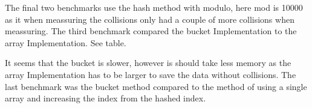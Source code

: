 \documentclass[a4paper,11pt]{article}
\begin{document}
\begin{table}[h]
    \begin{center}
    \caption{Results from the benchmark of binary search compared to looking directly in an array}
    \label{tab:table2}
    \end{center}
\end{table}

\FloatBarrier{\noindent}
The final two benchmarks use the hash method with modulo, here mod is 10000 as it when meassuring the collisions only had a couple of 
more collisions when meassuring. The third benchmark compared the bucket Implementation to the array Implementation. See table.

\begin{table}[h]
    \begin{center}
    \caption{Results from the benchmark of bucket compared to looking directly in an array}
    \label{tab:table3}
    \end{center}
\end{table}

\FloatBarrier{\noindent}
It seems that the bucket is slower, however is should take less memory as the array Implementation has to be larger to save the data without collisions. The last benchmark was the bucket method compared to the 
method of using a single array and increasing the index from the hashed index. 
\begin{table}[h]
    \begin{center}
    \caption{Results from the benchmark of the two methods of saving hashed data}
    \label{tab:table4}
    \end{center}
\end{table}
\end{document}
